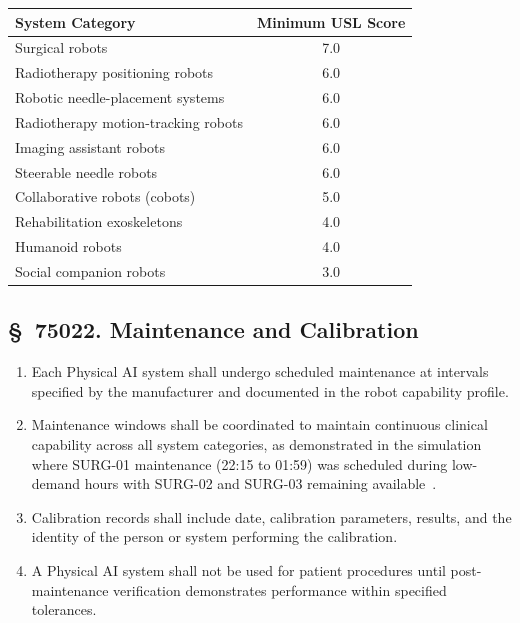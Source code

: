 \begin{center}
\begin{tabular}{lc}
\toprule
\textbf{System Category} & \textbf{Minimum USL Score} \\
\midrule
Surgical robots & 7.0 \\
Radiotherapy positioning robots & 6.0 \\
Robotic needle-placement systems & 6.0 \\
Radiotherapy motion-tracking robots & 6.0 \\
Imaging assistant robots & 6.0 \\
Steerable needle robots & 6.0 \\
Collaborative robots (cobots) & 5.0 \\
Rehabilitation exoskeletons & 4.0 \\
Humanoid robots & 4.0 \\
Social companion robots & 3.0 \\
\bottomrule
\end{tabular}
\end{center}

\subsection{\S~75022. Maintenance and Calibration}

\begin{enumerate}[label=(\alph*)]
\item Each Physical AI system shall undergo scheduled maintenance at intervals
  specified by the manufacturer and documented in the robot capability profile.

\item Maintenance windows shall be coordinated to maintain continuous clinical
  capability across all system categories, as demonstrated in the simulation
  where SURG-01 maintenance (22:15 to 01:59) was scheduled during low-demand
  hours with SURG-02 and SURG-03 remaining
  available~\cite{newtrial2026}.

\item Calibration records shall include date, calibration parameters, results,
  and the identity of the person or system performing the calibration.

\item A Physical AI system shall not be used for patient procedures until
  post-maintenance verification demonstrates performance within specified
  tolerances.
\end{enumerate}

